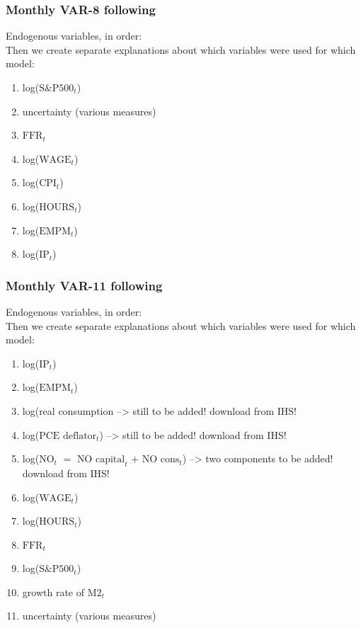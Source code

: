 \documentclass[a4paper,11pt,listof=nochaptergap,oneside,pointednumbers,bibtotoc,bigheadings,liststotoc]{scrbook}
\renewcommand*{\paragraph}[1]{\subsubsection*{#1} \vspace{-3mm}} %
\begin{document}
\paragraph{Monthly VAR-8 following \citet{bloom:09}} Endogenous variables, in order:\\
Then we create separate explanations about which variables were used for which model:\\

\begingroup
\begin{spacing}{0.5}
    \fontsize{10pt}{12pt}\selectfont
\begin{enumerate}
	\item log($\text{S\&P500}_t$)
	\item uncertainty (various measures)
	\item $\text{FFR}_t$
	\item log($\text{WAGE}_t$)
	\item log($\text{CPI}_t$)
	\item log($\text{HOURS}_t$)
	\item log($\text{EMPM}_t$)	
	\item log($\text{IP}_t$)		
\end{enumerate}
\end{spacing}
\endgroup



\paragraph{Monthly VAR-11 following \citet{juradoetal:15}} Endogenous variables, in order:\\
Then we create separate explanations about which variables were used for which model:\\

\begingroup
\begin{spacing}{0.5}
    \fontsize{10pt}{12pt}\selectfont
\begin{enumerate}
	\item log($\text{IP}_t$)
	\item log($\text{EMPM}_t$)
	\item log(real consumption --> still to be added! download from IHS!
	\item log($\text{PCE deflator}_t$) --> still to be added! download from IHS!
	\item log($\text{NO}_t$ $=$ $\text{NO capital}_t$ $+$ $\text{NO cons}_t$) --> two components to be added! download from IHS!
	\item log($\text{WAGE}_t$)
	\item log($\text{HOURS}_t$)
	\item $\text{FFR}_t$
	\item log($\text{S\&P500}_t$)
	\item growth rate of $\text{M2}_t$
	\item uncertainty (various measures)
\end{enumerate}
\end{spacing}
\endgroup
\end{document}
